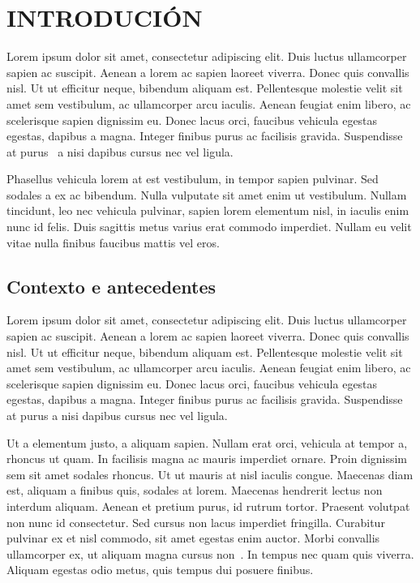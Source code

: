 \documentclass{pfc}
\begin{document}
\blankpage
\pagestyle{plain}

\tableofcontents %

\listoffigures %

\listoftables %

\mainmatter

\pagestyle{fancy}
\fancyhead{}
\fancyhead[LE]{\leftmark}
\fancyhead[RO]{\rightmark}
\renewcommand{\headrulewidth}{0.5pt}



\chapter{INTRODUCIÓN}

Lorem ipsum dolor sit amet, consectetur adipiscing elit. Duis luctus
ullamcorper sapien ac suscipit. Aenean a lorem ac sapien laoreet
viverra. Donec quis convallis nisl. Ut ut efficitur neque, bibendum
aliquam est. Pellentesque molestie velit sit amet sem vestibulum, ac
ullamcorper arcu iaculis. Aenean feugiat enim libero, ac scelerisque
sapien dignissim eu. Donec lacus orci, faucibus vehicula egestas
egestas, dapibus a magna. Integer finibus purus ac facilisis
gravida. Suspendisse at purus~\cite{HenessyPatterson} a nisi dapibus
cursus nec vel ligula.

Phasellus vehicula lorem at est vestibulum, in tempor sapien
pulvinar. Sed sodales a ex ac bibendum. Nulla vulputate sit amet enim
ut vestibulum. Nullam tincidunt, leo nec vehicula pulvinar, sapien
lorem elementum nisl, in iaculis enim nunc id felis. Duis sagittis
metus varius erat commodo imperdiet. Nullam eu velit vitae nulla
finibus faucibus mattis vel eros.


\section{Contexto e antecedentes}

Lorem ipsum dolor sit amet, consectetur adipiscing elit. Duis luctus
ullamcorper sapien ac suscipit. Aenean a lorem ac sapien laoreet
viverra. Donec quis convallis nisl. Ut ut efficitur neque, bibendum
aliquam est. Pellentesque molestie velit sit amet sem vestibulum, ac
ullamcorper arcu iaculis. Aenean feugiat enim libero, ac scelerisque
sapien dignissim eu. Donec lacus orci, faucibus vehicula egestas
egestas, dapibus a magna. Integer finibus purus ac facilisis
gravida. Suspendisse at purus a nisi dapibus cursus nec vel ligula.

Ut a elementum justo, a aliquam sapien. Nullam erat orci, vehicula at
tempor a, rhoncus ut quam. In facilisis magna ac mauris imperdiet
ornare. Proin dignissim sem sit amet sodales rhoncus. Ut ut mauris at
nisl iaculis congue. Maecenas diam est, aliquam a finibus quis,
sodales at lorem. Maecenas hendrerit lectus non interdum
aliquam. Aenean et pretium purus, id rutrum tortor. Praesent volutpat
non nunc id consectetur. Sed cursus non lacus imperdiet
fringilla. Curabitur pulvinar ex et nisl commodo, sit amet egestas
enim auctor. Morbi convallis ullamcorper ex, ut aliquam magna cursus
non~\cite{MapReduce, gromacs3}. In tempus nec quam quis
viverra. Aliquam egestas odio metus, quis tempus dui posuere finibus.
\end{document}
